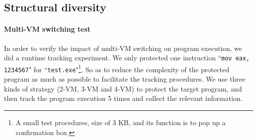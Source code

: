 \documentclass[preprint,12pt,3p]{elsarticle}
\begin{document}
\subsection{Structural diversity}\label{sec:s-d}

\paragraph*{Multi-VM switching test}
In order to verify the impact of multi-VM switching on program execution, we did a runtime tracking experiment.
We only protected one instruction ``\texttt{mov eax, 1234567}" for ``\texttt{test.exe}"\footnote{A small test procedures, size of 3 KB, and its function is to pop up a confirmation box.}.
So as to reduce the complexity of the protected program as much as possible to facilitate the tracking procedures.
We use three kinds of strategy (2-VM, 3-VM and 4-VM) to protect the target program,
and then track the program execution 5 times and collect the relevant information.
\end{document}
